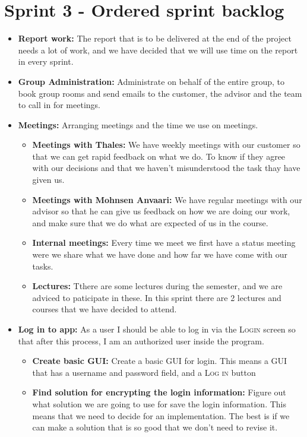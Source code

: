 

\section{Sprint 3 - Ordered sprint backlog}

\begin{itemize}
\item{}\textbf{Report work:} The report that is to be delivered at the end of the project needs a lot of work, and we have decided that we will use time on the report in every sprint.
\item{}\textbf{Group Administration:} Administrate on behalf of the entire group, to book group rooms and send emails to the customer, the advisor and the team to call in for meetings.
\item{}\textbf{Meetings:} Arranging meetings and the time we use on meetings.
\begin{itemize}
\item{}\textbf{Meetings with Thales:} We have weekly meetings with our customer so that we can get rapid feedback on what we do. To know if they agree with our decisions and that we haven't misunderstood the task thay have given us.
\item{}\textbf{Meetings with Mohnsen Anvaari:} We have regular meetings with our advisor so that he can give us feedback on how we are doing our work, and make sure that we do what are expected of us in the course.
\item{}\textbf{Internal meetings:} Every time we meet we first have a status meeting were we share what we have done and how far we have come with our tasks.
\item{}\textbf{Lectures:} Tthere are some lectures during the semester, and we are adviced to paticipate in these. In this sprint there are 2 lectures and courses that we have decided to attend.
\end{itemize}
\item{}\textbf{Log in to app:} As a user I should be able to log in via the \textsc{Login} screen so that after this process, I am an authorized user inside the program.
\begin{itemize}
\item{}\textbf{Create basic GUI:} Create a basic GUI for login. This means a GUI that has a username and password field, and a \textsc{Log in} button
\item{}\textbf{Find solution for encrypting the login information:} Figure out what solution we are going to use for save the login information. This means that we need to decide for an implementation. The best is if we can make a solution that is so good that we don’t need to revise it.

\end{itemize}
\end{itemize}
